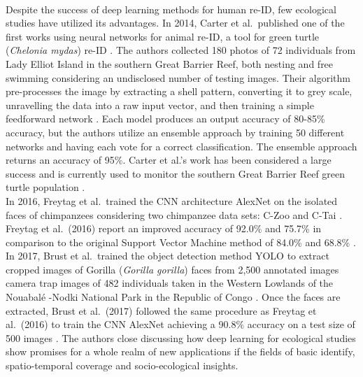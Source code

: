 \documentclass[11pt]{article}
\begin{document}
\newline
\\
Despite the success of deep learning methods for human re-ID, few ecological studies have utilized its advantages. In 2014, Carter et al.\ published one of the first works using neural networks for animal re-ID, a tool for green turtle (\textit{Chelonia mydas}) re-ID \cite{carter2014automated}. The authors collected 180 photos of 72 individuals from Lady Elliot Island in the southern Great Barrier Reef, both nesting and free swimming considering an undisclosed number of testing images. Their algorithm pre-processes the image by extracting a shell pattern, converting it to grey scale, unravelling the data into a raw input vector, and then training a simple feedforward network \cite{carter2014automated}. Each model produces an output accuracy of 80-85\% accuracy, but the authors utilize an ensemble approach by training 50 different networks and having each vote for a correct classification. The ensemble approach returns an accuracy of 95\%. Carter et al.'s work has been considered a large success and is currently used to monitor the southern Great Barrier Reef green turtle population \cite{carter2014automated}. 
\newline
\\
In 2016, Freytag et al.\ trained the CNN architecture AlexNet on the isolated faces of chimpanzees considering two chimpanzee data sets: C-Zoo and C-Tai \cite{freytag2016chimpanzee}. Freytag et al.\ (2016) report an improved accuracy of 92.0\% and 75.7\% in comparison to the original Support Vector Machine method of 84.0\% and 68.8\% \cite{freytag2016chimpanzee, loos2013automated}. In 2017, Brust et al.\ trained the object detection method YOLO to extract cropped images of Gorilla (\textit{Gorilla gorilla}) faces from 2,500 annotated images camera trap images of 482 individuals taken in the Western Lowlands of the Nouabal\'e -Nodki National Park in the Republic of Congo \cite{brust2017towards, redmon2016you}. Once the faces are extracted, Brust et al.\ (2017) followed the same procedure as Freytag et al.\ (2016) to train the CNN AlexNet achieving a 90.8\% accuracy on a test size of 500 images \cite{freytag2016chimpanzee, brust2017towards}. The authors close discussing how deep learning for ecological studies show promises for a whole realm of new applications if the fields of basic identify, spatio-temporal coverage and socio-ecological insights. \cite{freytag2016chimpanzee, brust2017towards}
\newline
\\
\end{document}
